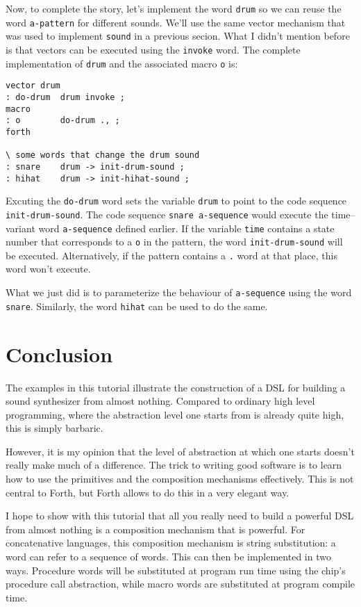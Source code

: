 \documentclass[12pt]{article}
\begin{document}
Now, to complete the story, let's implement the word \verb|drum| so we
can reuse the word \verb|a-pattern| for different sounds.  We'll use
the same vector mechanism that was used to implement \verb|sound| in a
previous secion. What I didn't mention before is that vectors can be
executed using the \verb|invoke| word. The complete implementation of
\verb|drum| and the associated macro \verb|o| is:
\begin{verbatim}
vector drum
: do-drum  drum invoke ;   
macro
: o        do-drum ., ;  
forth

\ some words that change the drum sound
: snare    drum -> init-drum-sound ;
: hihat    drum -> init-hihat-sound ;

\end{verbatim}
Excuting the \verb|do-drum| word sets the variable \verb|drum| to
point to the code sequence \verb|init-drum-sound|.  The code sequence
\verb|snare a-sequence| would execute the time--variant word
\verb|a-sequence| defined earlier. If the variable \verb|time|
contains a state number that corresponds to a \verb|o| in the pattern,
the word \verb|init-drum-sound| will be executed. Alternatively, if
the pattern contains a \verb|.| word at that place, this word won't
execute.

What we just did is to parameterize the behaviour of \verb|a-sequence|
using the word \verb|snare|. Similarly, the word \verb|hihat| can be
used to do the same.

\section{Conclusion}

The examples in this tutorial illustrate the construction of a DSL for
building a sound synthesizer from almost nothing. Compared to ordinary
high level programming, where the abstraction level one starts from is
already quite high, this is simply barbaric.

However, it is my opinion that the level of abstraction at which one
starts doesn't really make much of a difference. The trick to writing
good software is to learn how to use the primitives and the
composition mechanisms effectively. This is not central to Forth, but
Forth allows to do this in a very elegant way.

I hope to show with this tutorial that all you really need to build a
powerful DSL from almost nothing is a composition mechanism that is
powerful. For concatenative languages, this composition mechanism is
string substitution: a word can refer to a sequence of words. This can
then be implemented in two ways. Procedure words will be substituted
at program run time using the chip's procedure call abstraction, while
macro words are substituted at program compile time.
\end{document}

